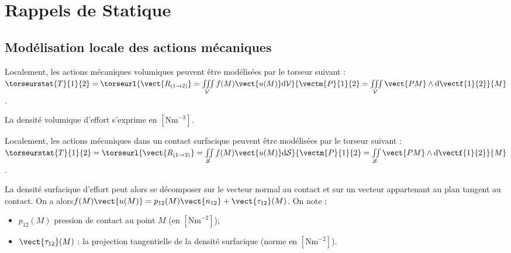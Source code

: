 \setchapterpreamble[u]{\margintoc}

\chapter{Rappels de Statique}




\section{Modélisation locale des actions mécaniques}
\begin{defi}
Localement, les actions mécaniques volumiques peuvent être modélisées par le torseur suivant :
$
\torseurstat{T}{1}{2}=
\torseurl{%
\vect{R_{(1\rightarrow 2)}} 
= \iiint\limits_{\mathcal{V}} f(M) \vect{u(M)} \text{d}\mathcal{V}}{%
\vectm{P}{1}{2} = \iiint\limits_{\mathcal{V}}\vect{PM}\wedge \text{d}\vectf{1}{2}}{M}
$.

La densité volumique d'effort s'exprime en $\left[\text{Nm}^{-3}\right]$.
\end{defi}

\begin{defi}
Localement, les actions mécaniques dans un contact surfacique peuvent être modélisées par le torseur suivant :
$
\torseurstat{T}{1}{2}=
\torseurl{%
\vect{R_{(1\rightarrow 2)}} 
= \iint\limits_{\mathcal{S}} f(M) \vect{u(M)} \text{d}\mathcal{S}}{%
\vectm{P}{1}{2} = \iint\limits_{\mathcal{S}}\vect{PM}\wedge \text{d}\vectf{1}{2}}{M}
$.

La densité surfacique d'effort peut alors se décomposer sur le vecteur normal au contact et sur un vecteur appartenant au plan tangent au contact. On a alors$f(M) \vect{u(M)} = p_{12}(M)\vect{n_{12}}+\vect{\tau_{12}}(M)$. 
On note ;
\begin{itemize}
\item $p_{12}(M)$ pression de contact au point $M$ (en $\left[\text{Nm}^{-2}\right]$);
\item $\vect{\tau_{12}}(M)$ : la projection tangentielle de la densité surfacique (norme en $\left[\text{Nm}^{-2}\right]$).
\end{itemize}
\end{defi}

